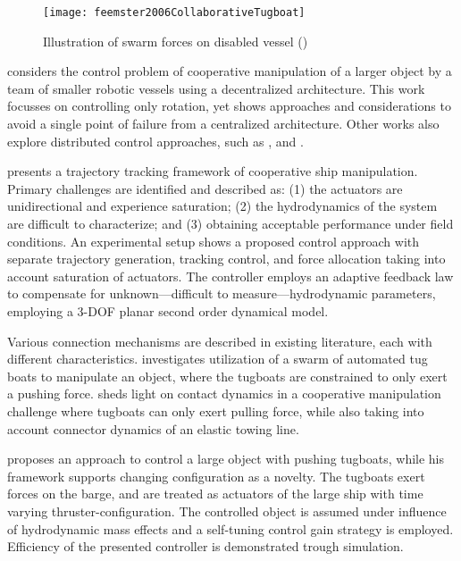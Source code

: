 \begin{figure}[h!]
	\centering
	\texttt{[image: feemster2006CollaborativeTugboat]}
	\caption{Illustration of swarm forces on disabled vessel (\citet{feemster2006manipulation})}
	\label{feemster2006manipulationExample}
\end{figure}

\citet{feemster2006manipulation} considers the control problem of cooperative manipulation of a larger object by a team of smaller robotic vessels using a decentralized architecture. This work focusses on controlling only rotation, yet shows approaches and considerations to avoid a single point of failure from a centralized architecture. Other works also explore distributed control approaches, such as \citet{4282954},\citet{habibi2016distributed} and \citet{chen2019distributed}.

\citet{feemster2011comprehensive} presents a trajectory tracking framework of cooperative ship manipulation. Primary challenges are identified and described as: (1) the actuators are unidirectional and experience saturation; (2) the hydrodynamics of the system are difficult to characterize; and (3) obtaining acceptable performance under field conditions. An experimental setup shows a proposed control approach with separate trajectory generation, tracking control, and force allocation taking into account saturation of actuators. The controller employs an adaptive feedback law to compensate for unknown—difficult to measure—hydrodynamic parameters, employing a 3-DOF planar second order dynamical model. 

Various connection mechanisms are described in existing literature, each with different characteristics. \citet{smith2007swarn} investigates utilization of a swarm of automated tug boats to manipulate an object, where the tugboats are constrained to only exert a pushing force.  \citet{chen2019distributed} sheds light on contact dynamics in a cooperative manipulation challenge where tugboats can only exert pulling force, while also taking into account connector dynamics of an elastic towing line. 

\citet{bidikli2016robust} proposes an approach to control a large object with pushing tugboats, while his framework supports changing configuration as a novelty. The tugboats exert forces on the barge, and are treated as actuators of the large ship with time varying thruster-configuration. The controlled object is assumed under influence of hydrodynamic mass effects  and a self-tuning control gain strategy is employed. Efficiency of the presented controller is demonstrated trough simulation.

